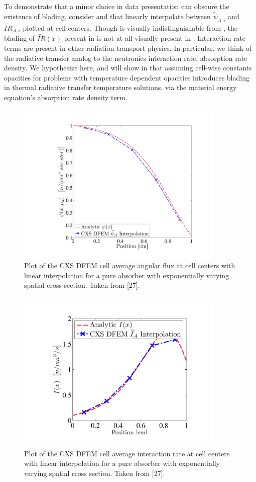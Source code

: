 To demonstrate that a minor choice in data presentation can obscure the existence of blading, consider  and  that linearly interpolate between $\widetilde{\psi}_{A,i}$ and  $\widetilde{IR}_{A,i}$ plotted at cell centers.
Though  is visually indistinguishable from , the blading of $\widetilde{IR}(x)$ present in  is not at all visually present in .
Interaction rate terms are present in other radiation transport physics.
In particular, we think of the radiative transfer analog to the neutronics interaction rate, absorption rate density.
We hypothesize here, and will show in  that assuming cell-wise constants opacities for problems with temperature dependent opacities introduces blading in thermal radiative transfer temperature solutions, via the material energy equation's absorption rate density term.
\begin{figure}[!htp]
\centering
\includegraphics[width=10cm,trim=1.5in  0.75in 1in 1.1in,clip=true]{chapter3_variable_xs/CXS_Psi_A_Profile.pdf}
\caption{Plot of the CXS DFEM cell average angular flux at cell centers with linear interpolation for a pure absorber with exponentially varying spatial cross section.  Taken from [27].}
\label{fig:cxs_avg_psi}
\end{figure}
%
\begin{figure}[!hbp]
\centering
\includegraphics[width=10cm,trim=0.75in  0.4in 0.75in 0.6in,clip=true]{chapter3_variable_xs/CXS_I_A_Profile.pdf}
\caption{Plot of the CXS DFEM cell average interaction rate at cell centers with linear interpolation for a pure absorber with exponentially varying spatial cross section.  Taken from [27].}
\label{fig:cxs_avg_ir}
\end{figure}
